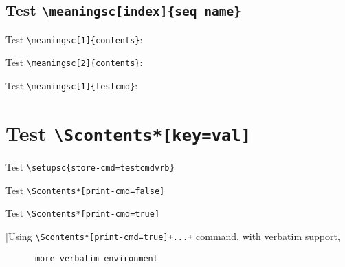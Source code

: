 \documentclass{article}
\begin{document}

\noindent\hrulefill

\subsection{Test \texttt{\textbackslash meaningsc[index]\{seq name\}}}

\noindent\hrulefill

Test \verb+\meaningsc[1]{contents}+:\par


\noindent\hrulefill

Test \verb+\meaningsc[2]{contents}+:\par


\noindent\hrulefill

Test \verb+\meaningsc[1]{testcmd}+:\par


\noindent\hrulefill

\section{Test \texttt{\textbackslash Scontents*[key=val]}}

Test \verb+\setupsc{store-cmd=testcmdvrb}+\par
{}

Test \verb+\Scontents*[print-cmd=false]+\par


Test \verb+\Scontents*[print-cmd=true]+\par
\Scontents*[print-cmd=true]|Using \verb/\Scontents*[print-cmd=true]+...+/ command, with verbatim support,

\begin{verbatim}
      more verbatim environment
\end{verbatim}
\end{document}
